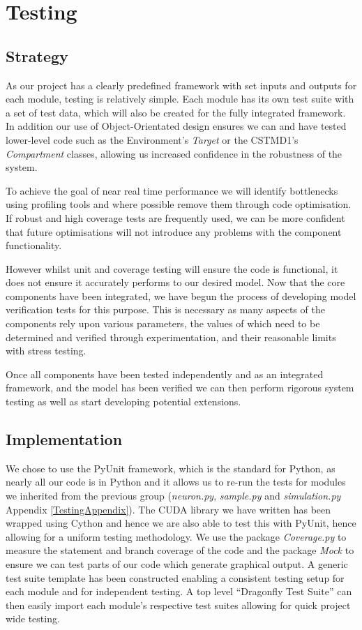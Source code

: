 \section{Testing}

\subsection{Strategy}

As our project has a clearly predefined framework with set inputs and outputs for each module, testing is relatively simple. Each module has its own test suite with a set of test data, which will also be created for the fully integrated framework. In addition our use of Object-Orientated design ensures we can and have tested lower-level code such as the Environment's \textit{Target} or the CSTMD1's \textit{Compartment} classes, allowing us increased confidence in the robustness of the system.

To achieve the goal of near real time performance we will identify bottlenecks using profiling tools and where possible remove them through code optimisation. If robust and high coverage tests are frequently used, we can be more confident that future optimisations  will not introduce any problems with the component functionality.

However whilst unit and coverage testing will ensure the code is functional, it does not ensure it accurately performs to our desired model. Now that the core components have been integrated, we have begun the process of developing model verification tests for this purpose. This is necessary as many aspects of the components rely upon various parameters, the values of which need to be determined and verified through experimentation, and their reasonable limits with stress testing.

Once all components have been tested independently and as an integrated framework, and the model has been verified we can then perform rigorous system testing as well as start developing potential extensions.

\subsection{Implementation}

We chose to use the PyUnit framework, which is the standard for Python\cite{TESTING01}, as nearly all our code is in Python and it allows us to re-run the tests for modules we inherited from the previous group (\textit{neuron.py}, \textit{sample.py} and \textit{simulation.py} Appendix \ref{TestingAppendix}). The CUDA library we have written has been wrapped using Cython and hence we are also able to test this with PyUnit, hence allowing for a uniform testing methodology. We use the package \textit{Coverage.py} to measure the statement and branch coverage of the code and the package \textit{Mock} to ensure we can test parts of our code which generate graphical output. A generic test suite template has been constructed enabling a consistent testing setup for each module and for independent testing. A top level ``Dragonfly Test Suite'' can then easily import each module's respective test suites allowing for quick project wide testing.

